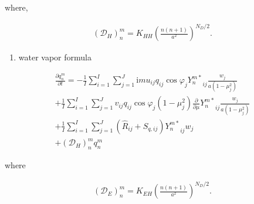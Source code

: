 where,

\begin{eqnarray}
({\mathcal D}_H)_n^m
   =  K_{HH} \left( \frac{n(n+1)}{a^{2}} \right)^{N_D/2} .
\end{eqnarray}

\begin{enumerate}
\def\labelenumi{\arabic{enumi}.}
\setcounter{enumi}{3}
\tightlist
\item
  water vapor formula
\end{enumerate}

\begin{eqnarray}
  \frac{\partial{q_n^m}}{\partial {t}}
   =  - \frac{1}{I} \sum_{i=1}^{I} \sum_{j=1}^{J}  
          \mathrm{i}m u_{ij} q_{ij} \cos\varphi_j
          {Y_n^{m *}}_{ij} \frac{w_j}{a(1-\mu_j^{2})}
          \\
     + \frac{1}{I} \sum_{i=1}^{I} \sum_{j=1}^{J}  
          v_{ij} q_{ij} \cos\varphi_j
          (1-\mu_j^2)
          \frac{\partial }{\partial \mu} {Y_n^{m *}}_{ij}
          \frac{w_j}{a(1-\mu_j^{2})}
          \\
     + \frac{1}{I} \sum_{i=1}^{I} \sum_{j=1}^{J}  
          \left( \hat{R}_{ij} + S_{q,ij} \right)
          {Y_n^{m *}}_{ij} w_j
          \\
     + ({\mathcal D}_H)_n^m q_n^m
\end{eqnarray}

where

\begin{eqnarray}
({\mathcal D}_E)_n^m
   =  K_{EH} \left( \frac{n(n+1)}{a^{2}} \right)^{N_D/2} .
\end{eqnarray}
